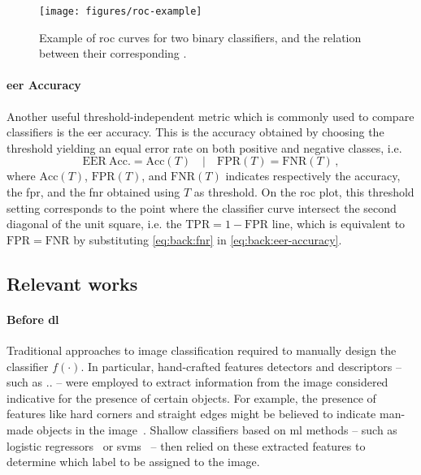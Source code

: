 \begin{figure}
    \centering
    \texttt{[image: figures/roc-example]}
    \caption{Example of \acrfull{roc} curves for two binary classifiers, and the relation between their corresponding . }
    \label{fig:back:roc}
\end{figure}

\paragraph{\acrshort{eer} Accuracy}
Another useful threshold-independent metric which is commonly used to compare classifiers is the \gls{eer} accuracy.
This is the accuracy obtained by choosing the threshold yielding an equal error rate on both positive and negative classes, i.e.
\begin{equation} \label{eq:back:eer-accuracy}
    \mathrm{EER\ Acc.} = \mathrm{Acc}(T) \quad | \quad \mathrm{FPR}(T) = \mathrm{FNR}(T) \,,
\end{equation}
where $\mathrm{Acc}(T)$, $\mathrm{FPR}(T)$, and $\mathrm{FNR}(T)$ indicates respectively the accuracy, the \gls{fpr}, and the \gls{fnr} obtained using $T$ as threshold.
On the \gls{roc} plot, this threshold setting corresponds to the point where the classifier curve intersect the second diagonal of the unit square, i.e. the $\mathrm{TPR} = 1 - \mathrm{FPR}$ line, which is equivalent to $\mathrm{FPR} = \mathrm{FNR}$ by substituting \ref{eq:back:fnr} in \ref{eq:back:eer-accuracy}.

\subsection{Relevant works}
\label{subsec:back:classif-relwork}

\paragraph{Before \acrlong{dl}}
Traditional approaches to image classification required to manually design the classifier $f(\cdot)$.
In particular, hand-crafted features detectors and descriptors -- such as .. -- were employed to extract information from the image considered indicative for the presence of certain objects.
For example, the presence of features like hard corners and straight edges might be believed to indicate man-made objects in the image~\cite{}.
Shallow classifiers based on \gls{ml} methods -- such as logistic regressors~\cite{} or \glspl{svm}~\cite{} -- then relied on these extracted features to determine which label to be assigned to the image.

